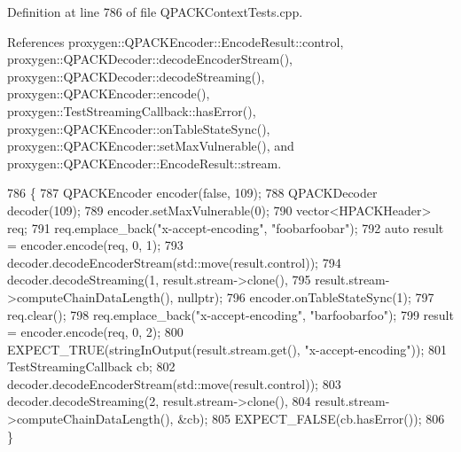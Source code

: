 Definition at line 786 of file Q\+P\+A\+C\+K\+Context\+Tests.\+cpp.



References proxygen\+::\+Q\+P\+A\+C\+K\+Encoder\+::\+Encode\+Result\+::control, proxygen\+::\+Q\+P\+A\+C\+K\+Decoder\+::decode\+Encoder\+Stream(), proxygen\+::\+Q\+P\+A\+C\+K\+Decoder\+::decode\+Streaming(), proxygen\+::\+Q\+P\+A\+C\+K\+Encoder\+::encode(), proxygen\+::\+Test\+Streaming\+Callback\+::has\+Error(), proxygen\+::\+Q\+P\+A\+C\+K\+Encoder\+::on\+Table\+State\+Sync(), proxygen\+::\+Q\+P\+A\+C\+K\+Encoder\+::set\+Max\+Vulnerable(), and proxygen\+::\+Q\+P\+A\+C\+K\+Encoder\+::\+Encode\+Result\+::stream.


\begin{DoxyCode}
786                                                   \{
787   QPACKEncoder encoder(\textcolor{keyword}{false}, 109);
788   QPACKDecoder decoder(109);
789   encoder.setMaxVulnerable(0);
790   vector<HPACKHeader> req;
791   req.emplace\_back(\textcolor{stringliteral}{"x-accept-encoding"}, \textcolor{stringliteral}{"foobarfoobar"});
792   \textcolor{keyword}{auto} result = encoder.encode(req, 0, 1);
793   decoder.decodeEncoderStream(std::move(result.control));
794   decoder.decodeStreaming(1, result.stream->clone(),
795                           result.stream->computeChainDataLength(), \textcolor{keyword}{nullptr});
796   encoder.onTableStateSync(1);
797   req.clear();
798   req.emplace\_back(\textcolor{stringliteral}{"x-accept-encoding"}, \textcolor{stringliteral}{"barfoobarfoo"});
799   result = encoder.encode(req, 0, 2);
800   EXPECT\_TRUE(stringInOutput(result.stream.get(), \textcolor{stringliteral}{"x-accept-encoding"}));
801   TestStreamingCallback cb;
802   decoder.decodeEncoderStream(std::move(result.control));
803   decoder.decodeStreaming(2, result.stream->clone(),
804                           result.stream->computeChainDataLength(), &cb);
805   EXPECT\_FALSE(cb.hasError());
806 \}
\end{DoxyCode}
